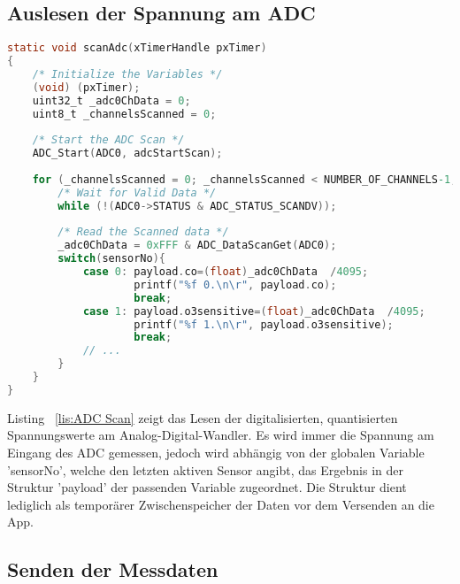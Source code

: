 \subsection{Auslesen der Spannung am \acs{ADC}}\label{subsec:Auslesen der Spannung am ADC}
\begin{lstlisting}[language=C, caption={\acs{ADC} Scan Task}, label=lis:ADC Scan]
static void scanAdc(xTimerHandle pxTimer)
{
	/* Initialize the Variables */
	(void) (pxTimer);
	uint32_t _adc0ChData = 0;
	uint8_t _channelsScanned = 0;
	
	/* Start the ADC Scan */
	ADC_Start(ADC0, adcStartScan);
	
	for (_channelsScanned = 0; _channelsScanned < NUMBER_OF_CHANNELS-1; _channelsScanned++) {
		/* Wait for Valid Data */
		while (!(ADC0->STATUS & ADC_STATUS_SCANDV));
		
		/* Read the Scanned data */
		_adc0ChData = 0xFFF & ADC_DataScanGet(ADC0);
		switch(sensorNo){
			case 0: payload.co=(float)_adc0ChData  /4095;
					printf("%f 0.\n\r", payload.co);
					break;
			case 1: payload.o3sensitive=(float)_adc0ChData  /4095;
					printf("%f 1.\n\r", payload.o3sensitive);
					break;
			// ...
		}
	}
}
\end{lstlisting}
Listing ~\ref{lis:ADC Scan} zeigt das Lesen der digitalisierten, quantisierten Spannungswerte am Analog-Digital-Wandler. Es wird immer die Spannung am Eingang des \acs{ADC} gemessen, jedoch wird abhängig von der globalen Variable 'sensorNo', welche den letzten aktiven Sensor angibt, das Ergebnis in der Struktur 'payload' der passenden Variable zugeordnet. Die Struktur dient lediglich als temporärer Zwischenspeicher der Daten vor dem Versenden an die App.
\subsection{Senden der Messdaten}\label{subsec:Senden der Messdaten}

